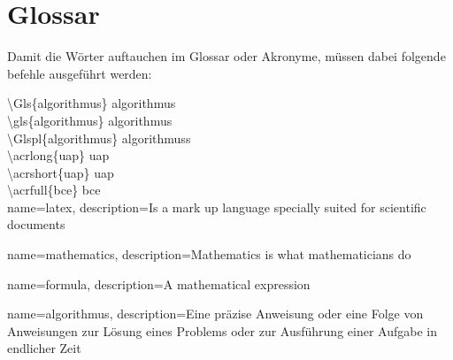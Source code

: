 \section{Glossar}

Damit die Wörter auftauchen im Glossar oder Akronyme, müssen dabei folgende befehle ausgeführt werden:

\textbackslash Gls\{algorithmus\} \Gls{algorithmus}     \\ 
\textbackslash gls\{algorithmus\} \gls{algorithmus}     \\
\textbackslash Glspl\{algorithmus\} \Glspl{algorithmus} \\

\textbackslash acrlong\{uap\} \acrlong{uap}     \\
\textbackslash acrshort\{uap\} \acrshort{uap}   \\
\textbackslash acrfull\{bce\} \acrfull{bce}     \\


{
        name=latex,
        description={Is a mark up language specially suited for 
scientific documents}
}

{
        name=mathematics,
        description={Mathematics is what mathematicians do}
}

{
        name=formula,
        description={A mathematical expression}
}

{
        name=algorithmus,
        description={Eine präzise Anweisung oder eine Folge von Anweisungen zur Lösung eines Problems oder zur Ausführung einer Aufgabe in endlicher Zeit}
}







\printglossaries